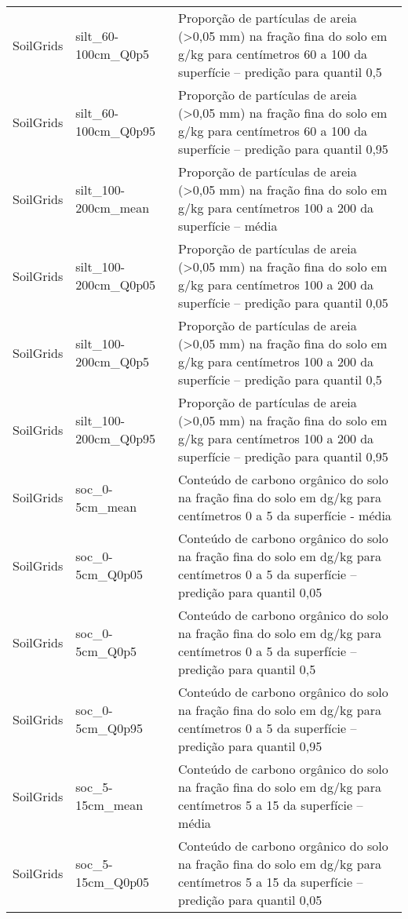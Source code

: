 \begin{longtable}{@{} p{4cm} p{4cm} p{8cm} @{}}
	SoilGrids &
	silt\_60-100cm\_Q0p5 &
	Proporção de partículas de areia (\textgreater 0,05 mm) na fração fina do solo em g/kg para centímetros 60 a 100 da superfície – predição para quantil 0,5 \\
	SoilGrids &
	silt\_60-100cm\_Q0p95 &
	Proporção de partículas de areia (\textgreater 0,05 mm) na fração fina do solo em g/kg para centímetros 60 a 100 da superfície – predição para quantil 0,95 \\
	SoilGrids &
	silt\_100-200cm\_mean &
	Proporção de partículas de areia (\textgreater 0,05 mm) na fração fina do solo em g/kg para centímetros 100 a 200 da superfície – média \\
	SoilGrids &
	silt\_100-200cm\_Q0p05 &
	Proporção de partículas de areia (\textgreater 0,05 mm) na fração fina do solo em g/kg para centímetros 100 a 200 da superfície – predição para quantil 0,05 \\
	SoilGrids &
	silt\_100-200cm\_Q0p5 &
	Proporção de partículas de areia (\textgreater 0,05 mm) na fração fina do solo em g/kg para centímetros 100 a 200 da superfície – predição para quantil 0,5 \\
	SoilGrids &
	silt\_100-200cm\_Q0p95 &
	Proporção de partículas de areia (\textgreater 0,05 mm) na fração fina do solo em g/kg para centímetros 100 a 200 da superfície – predição para quantil 0,95 \\
	SoilGrids &
	soc\_0-5cm\_mean &
	Conteúdo de carbono orgânico do solo na fração fina do solo em dg/kg para centímetros 0 a 5 da superfície - média \\
	SoilGrids &
	soc\_0-5cm\_Q0p05 &
	Conteúdo de carbono orgânico do solo na fração fina do solo em dg/kg para centímetros 0 a 5 da superfície – predição para quantil 0,05 \\
	SoilGrids &
	soc\_0-5cm\_Q0p5 &
	Conteúdo de carbono orgânico do solo na fração fina do solo em dg/kg para centímetros 0 a 5 da superfície – predição para quantil 0,5 \\
	SoilGrids &
	soc\_0-5cm\_Q0p95 &
	Conteúdo de carbono orgânico do solo na fração fina do solo em dg/kg para centímetros 0 a 5 da superfície – predição para quantil 0,95 \\
	SoilGrids &
	soc\_5-15cm\_mean &
	Conteúdo de carbono orgânico do solo na fração fina do solo em dg/kg para centímetros 5 a 15 da superfície – média \\
	SoilGrids &
	soc\_5-15cm\_Q0p05 &
	Conteúdo de carbono orgânico do solo na fração fina do solo em dg/kg para centímetros 5 a 15 da superfície – predição para quantil 0,05 \\

\end{longtable}
